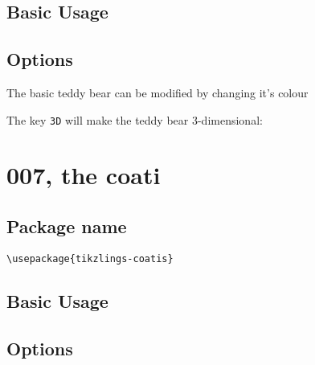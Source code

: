 \documentclass[parskip=half]{scrartcl}
\begin{document}
\subsection{Basic Usage}

\begin{tcblisting}{}
\bear
\end{tcblisting}

\subsection{Options}

The basic teddy bear can be modified by changing it's colour

\begin{tcblisting}{}
\bear[body=SteelBlue]
\end{tcblisting}

The key \lstinline|3D| will make the teddy bear 3-dimensional:

\begin{tcblisting}{}
\bear[3D]
\end{tcblisting}


\clearpage
\section[\textbackslash coati]{007, the coati}

\subsection{Package name}

\begin{tcolorbox}[lower separated=false, lefthand width=.8\linewidth]
\vspace*{0.5cm}
\lstinline|\usepackage{tikzlings-coatis}|
\vspace*{0.5cm}
\end{tcolorbox}

\subsection{Basic Usage}

\begin{tcblisting}{}
\coati
\end{tcblisting}

\subsection{Options}
\end{document}
